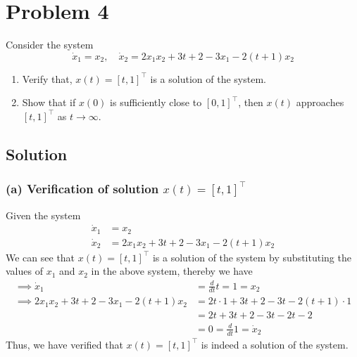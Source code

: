 \section*{Problem 4}

Consider the system
\begin{equation*}
    \dot{x}_{1}=x_{2}, \quad \dot{x}_{2}=2 x_{1} x_{2}+3 t+2-3 x_{1}-2(t+1) x_{2}
\end{equation*}
\begin{enumerate}[label= (\alph*)]
    \item Verify that, \( x(t)=[t, 1]^{\top} \) is a solution of the system.
    \item Show that if \( x(0) \) is sufficiently close to \( [0,1]^{\top} \), then \( x(t) \) approaches \( [t, 1]^{\top} \) as \( t \rightarrow \infty \).
\end{enumerate}

\subsection*{Solution}

\subsubsection*{(a) Verification of solution \( x(t) = {[t, 1]}^\top \)}

Given the system
\begin{align*}
    \dot{x}_{1}
     & =
    x_2
    \\
    \dot{x}_{2}
     & =
    2 x_{1} x_{2} + 3 t + 2 - 3 x_{1} - 2(t + 1) x_{2}
\end{align*}
We can see that \( x(t) = {[t, 1]}^\top \) is a solution of the system by substituting the values of \( x_1 \) and \( x_2 \) in the above system, thereby we have
\begin{align*}
    \implies
    \dot{x}_{1}
     & =
    \frac{d}{dt} t
    =
    1
    =
    x_2
    \\
    \implies
    2 x_{1} x_{2} + 3 t + 2 - 3 x_{1} - 2(t + 1) x_{2}
     & =
    2 t \cdot 1 + 3 t + 2 - 3 t - 2(t + 1) \cdot 1
    \\ & =
    2 t + 3 t + 2 - 3 t - 2 t - 2
    \\ & =
    0
    =
    \frac{d}{dt} 1
    =
    \dot{x}_{2}
\end{align*}
Thus, we have verified that \( x(t) = {[t, 1]}^\top \) is indeed a solution of the system.

